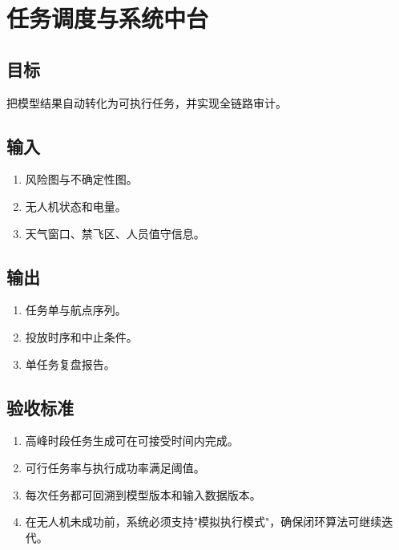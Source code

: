 \documentclass[12pt,a4paper,openany]{ctexrep}
\begin{document}
\chapter{任务调度与系统中台}

\section{目标}

把模型结果自动转化为可执行任务，并实现全链路审计。

\section{输入}

\begin{enumerate}
\item 风险图与不确定性图。
\item 无人机状态和电量。
\item 天气窗口、禁飞区、人员值守信息。
\end{enumerate}

\section{输出}

\begin{enumerate}
\item 任务单与航点序列。
\item 投放时序和中止条件。
\item 单任务复盘报告。
\end{enumerate}

\section{验收标准}

\begin{enumerate}
\item 高峰时段任务生成可在可接受时间内完成。
\item 可行任务率与执行成功率满足阈值。
\item 每次任务都可回溯到模型版本和输入数据版本。
\item 在无人机未成功前，系统必须支持"模拟执行模式"，确保闭环算法可继续迭代。
\end{enumerate}

\end{document}
